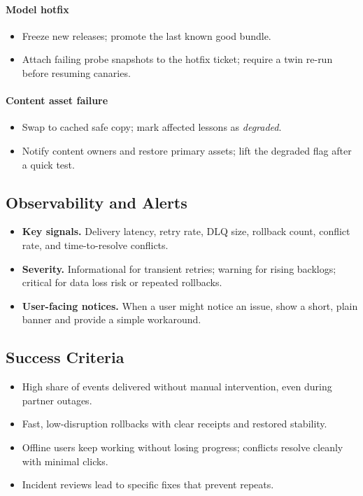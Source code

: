 \documentclass[12pt]{article}
\begin{document}
\paragraph{Model hotfix}
\begin{itemize}[leftmargin=*]
  \item Freeze new releases; promote the last known good bundle.
  \item Attach failing probe snapshots to the hotfix ticket; require a twin re-run before resuming canaries.
\end{itemize}

\paragraph{Content asset failure}
\begin{itemize}[leftmargin=*]
  \item Swap to cached safe copy; mark affected lessons as \emph{degraded}.
  \item Notify content owners and restore primary assets; lift the degraded flag after a quick test.
\end{itemize}

\subsection*{Observability and Alerts}
\begin{itemize}[leftmargin=*]
  \item \textbf{Key signals.} Delivery latency, retry rate, DLQ size, rollback count, conflict rate, and time-to-resolve conflicts.
  \item \textbf{Severity.} Informational for transient retries; warning for rising backlogs; critical for data loss risk or repeated rollbacks.
  \item \textbf{User-facing notices.} When a user might notice an issue, show a short, plain banner and provide a simple workaround.
\end{itemize}

\subsection*{Success Criteria}
\begin{itemize}[leftmargin=*]
  \item High share of events delivered without manual intervention, even during partner outages.
  \item Fast, low-disruption rollbacks with clear receipts and restored stability.
  \item Offline users keep working without losing progress; conflicts resolve cleanly with minimal clicks.
  \item Incident reviews lead to specific fixes that prevent repeats.
\end{itemize}
\end{document}
